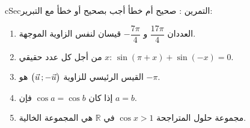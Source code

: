 \documentclass[12pt,a4paper]{article}
\newenvironment{BOX}[2]{\begin{otherlanguage}{english}\begin{arbox}{#1}{#2}}{\end{arbox}\end{otherlanguage}}
\newcounter{exo}
\newenvironment{tamrin}[1]{\stepcounter{exo}\begin{BOX}{cSec}{التمرين \theexo: #1}}{\end{BOX}}
\newcommand{\R}{\mathbb{R}}
\begin{document}
\begin{tamrin}{صحيح أم خطأ}
أجب بصحيح أو خطأ مع التبرير:
\begin{enumerate}
\item العددان $\dfrac{17\pi}{4}$ و $-\dfrac{7\pi}{4}$ قيسان لنفس الزاوية الموجهة.
\item من أجل كل عدد حقيقي $x$: $\sin(\pi+x)+\sin(-x)=0$.
\item القيس الرئيسي للزاوية $\big(\vec u\,;-\vec u\big)$ هو $-\pi$.
\item إذا كان $\cos a=\cos b$ فإن $a=b$.
\item مجموعة حلول المتراجحة $\cos x>1$ في $\R$ هي المجموعة الخالية.
\end{enumerate}
\end{tamrin}
\end{document}
